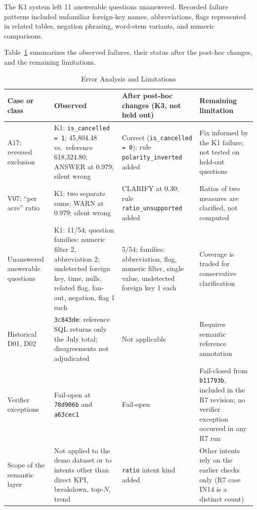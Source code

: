 \documentclass[conference]{IEEEtran}
\begin{document}
The K1 system left 11 answerable questions unanswered. Recorded failure patterns included unfamiliar foreign-key names, abbreviations, flags represented in related tables, negation phrasing, word-stem variants, and numeric comparisons.

Table~\ref{tab:errors} summarizes the observed failures, their status after the post-hoc changes, and the remaining limitations.

\begin{table}[!t]
\caption{Error Analysis and Limitations}
\label{tab:errors}
\centering
\footnotesize
\setlength{\tabcolsep}{3pt}
\begin{tabular}{@{}>{\raggedright}p{}>{\raggedright}p{}>{\raggedright}p{}>{\raggedright\arraybackslash}p{}@{}}
\toprule
\textbf{Case or class} & \textbf{Observed} & \textbf{After post-hoc changes (K3, not held out)} & \textbf{Remaining limitation} \\
\midrule
A17: reversed exclusion & K1: \texttt{is\_\allowbreak{}cancelled = 1}; 45,804.48 vs.\ reference 618,324.80; ANSWER at 0.979; silent wrong & Correct (\texttt{is\_\allowbreak{}cancelled = 0}); rule \texttt{polarity\_\allowbreak{}inverted} added & Fix informed by the K1 failure; not tested on held-out questions \\
V07: ``per acre'' ratio & K1: two separate sums; WARN at 0.979; silent wrong & CLARIFY at 0.30; rule \texttt{ratio\_\allowbreak{}unsupported} added & Ratios of two measures are clarified, not computed \\
Unanswered answerable questions & K1: 11/54; question families: numeric filter 2, abbreviation 2; undetected foreign key, time, nulls, related flag, fan-out, negation, flag 1 each & 5/54; families: abbreviation, flag, numeric filter, single value, undetected foreign key 1 each & Coverage is traded for conservative clarification \\
Historical D01, D02 & \texttt{3c843de}: reference SQL returns only the July total; disagreements not adjudicated & Not applicable & Requires semantic reference annotation \\
Verifier exceptions & Fail-open at \texttt{78d906b} and \texttt{a63cec1} & Fail-open & Fail-closed from \texttt{b11793b}, included in the R7 revision; no verifier exception occurred in any R7 run \\
Scope of the semantic layer & Not applied to the demo dataset or to intents other than direct KPI, breakdown, top-$N$, trend & \texttt{ratio} intent kind added & Other intents rely on the earlier checks only (R7 case IN14 is a distinct count) \\

\end{tabular}
\end{table}
\end{document}
